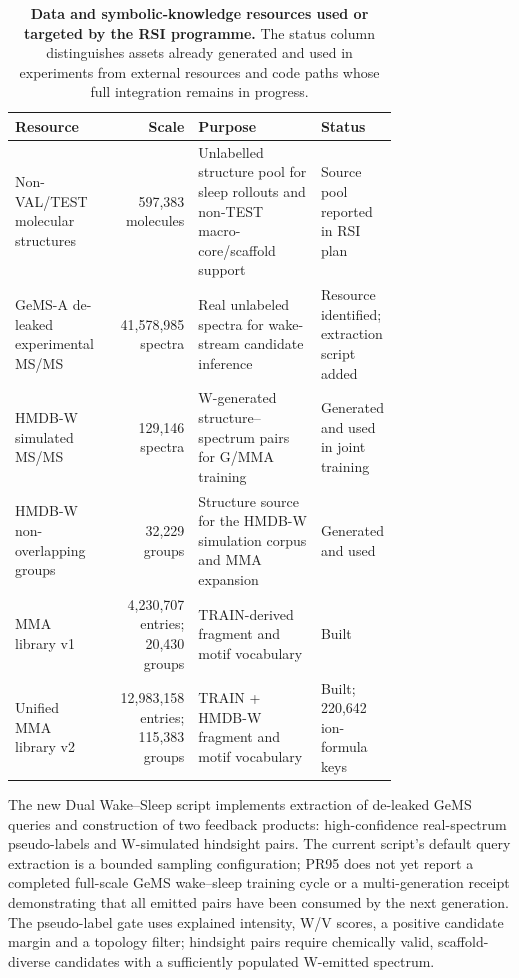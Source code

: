 \begin{table}[!htbp]
\centering
\caption{\textbf{Data and symbolic-knowledge resources used or targeted by the RSI programme.}
The status column distinguishes assets already generated and used in experiments
from external resources and code paths whose full integration remains in progress.}
\label{tab:rsi_data_assets}
\small
\setlength{\tabcolsep}{3pt}

\begin{tabular}{@{}p{0.25\linewidth}rp{0.32\linewidth}p{0.19\linewidth}@{}}
\toprule
Resource & Scale & Purpose & Status \\
\midrule
Non-VAL/TEST molecular structures & 597,383 molecules & Unlabelled structure pool for sleep rollouts and non-TEST macro-core/scaffold support & Source pool reported in RSI plan \\
GeMS-A de-leaked experimental MS/MS & 41,578,985 spectra & Real unlabeled spectra for wake-stream candidate inference & Resource identified; extraction script added \\
HMDB-W simulated MS/MS & 129,146 spectra & W-generated structure--spectrum pairs for G/MMA training & Generated and used in joint training \\
HMDB-W non-overlapping groups & 32,229 groups & Structure source for the HMDB-W simulation corpus and MMA expansion & Generated and used \\
MMA library v1 & 4,230,707 entries; 20,430 groups & TRAIN-derived fragment and motif vocabulary & Built \\
Unified MMA library v2 & 12,983,158 entries; 115,383 groups & TRAIN + HMDB-W fragment and motif vocabulary & Built; 220,642 ion-formula keys \\
\bottomrule
\end{tabular}
\end{table}

The new Dual Wake--Sleep script implements extraction of de-leaked GeMS queries
and construction of two feedback products: high-confidence real-spectrum
pseudo-labels and W-simulated hindsight pairs. The current script's default
query extraction is a bounded sampling configuration; PR95 does not yet report
a completed full-scale GeMS wake--sleep training cycle or a multi-generation
receipt demonstrating that all emitted pairs have been consumed by the next
generation. The pseudo-label gate uses explained intensity, W/V scores, a
positive candidate margin and a topology filter; hindsight pairs require
chemically valid, scaffold-diverse candidates with a sufficiently populated
W-emitted spectrum.

